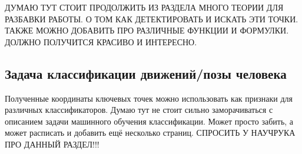 ДУМАЮ ТУТ СТОИТ ПРОДОЛЖИТЬ ИЗ РАЗДЕЛА МНОГО ТЕОРИИ ДЛЯ РАЗБАВКИ РАБОТЫ. О ТОМ КАК ДЕТЕКТИРОВАТЬ И ИСКАТЬ ЭТИ ТОЧКИ. ТАКЖЕ МОЖНО ДОБАВИТЬ ПРО РАЗЛИЧНЫЕ ФУНКЦИИ И ФОРМУЛКИ. ДОЛЖНО ПОЛУЧИТСЯ КРАСИВО И ИНТЕРЕСНО.

\subsection{Задача классификации движений/позы человека}
\label{subsec:Theory of classification}

Полученные координаты ключевых точек можно использовать как признаки для различных классификаторов. Думаю тут не стоит сильно заморачиваться с описанием задачи машинного обучения классификации. Может просто забить, а может расписать и добавить ещё несколько страниц. СПРОСИТЬ У НАУЧРУКА ПРО ДАННЫЙ РАЗДЕЛ!!!
\newpage